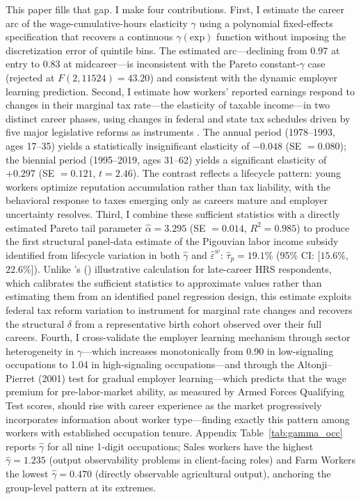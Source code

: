 \documentclass[12pt]{article}
\theoremstyle{definition}
\theoremstyle{remark}
\newcommand{\citepos}[1]{\citeauthor{#1}'s (\citeyear{#1})}
\begin{document}
This paper fills that gap. I make four contributions. First, I estimate the career arc of the
wage-cumulative-hours elasticity $\gamma$ using a polynomial fixed-effects specification that
recovers a continuous $\gamma(\text{exp})$ function without imposing the discretization error
of quintile bins. The estimated arc—declining from 0.97 at entry to 0.83 at midcareer—is
inconsistent with the Pareto constant-$\gamma$ case (rejected at $F(2, 11524) = 43.20$) and
consistent with the dynamic employer learning prediction.
Second, I estimate how workers' reported earnings respond to changes in their marginal
tax rate---the elasticity of taxable income---in two distinct career phases, using changes
in federal and state tax schedules driven by five major legislative reforms as instruments
\citep{gruber2002elasticity}. The annual period (1978--1993, ages 17--35) yields a
statistically insignificant elasticity of $-0.048$ (SE $= 0.080$); the biennial period
(1995--2019, ages 31--62) yields a significant elasticity of $+0.297$ (SE $= 0.121$, $t =
2.46$). The contrast reflects a lifecycle pattern: young workers optimize reputation
accumulation rather than tax liability, with the behavioral response to taxes emerging only
as careers mature and employer uncertainty resolves.
Third, I combine these sufficient statistics with a directly estimated Pareto tail parameter
$\hat{\alpha} = 3.295$ (SE $= 0.014$, $R^2 = 0.985$) to produce the first structural
panel-data estimate of the Pigouvian labor income subsidy identified from lifecycle variation
in both $\hat{\gamma}$ and $\hat{\varepsilon}^w$: $\hat{\tau}_p = 19.1\%$ (95\% CI:
$[15.6\%$, $22.6\%]$). Unlike \citepos{sztutman2024} illustrative calculation for late-career
HRS respondents, which calibrates the sufficient statistics to approximate values rather than
estimating them from an identified panel regression design, this estimate exploits federal tax
reform variation to instrument for marginal rate changes and recovers the structural $\delta$
from a representative birth cohort observed over their full careers.
Fourth, I cross-validate
the employer learning mechanism through sector heterogeneity in $\gamma$—which increases
monotonically from 0.90 in low-signaling occupations to 1.04 in high-signaling occupations—and
through the Altonji--Pierret (2001) test for gradual employer learning---which predicts
that the wage premium for pre-labor-market ability, as measured by Armed Forces Qualifying
Test scores, should rise with career experience as the market progressively incorporates
information about worker type---finding exactly this pattern among workers with established
occupation tenure. Appendix Table~\ref{tab:gamma_occ} reports $\hat{\gamma}$ for all nine 1-digit
occupations; Sales workers have the highest $\hat{\gamma} = 1.235$ (output observability
problems in client-facing roles) and Farm Workers the lowest $\hat{\gamma} = 0.470$ (directly
observable agricultural output), anchoring the group-level pattern at its extremes.
\end{document}
